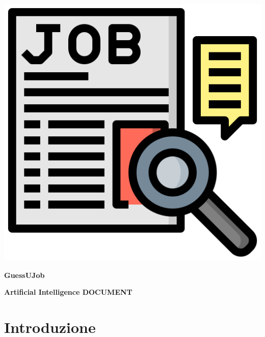 \documentclass{article}
\begin{document}
\thispagestyle{empty}

\begin{center}%
    \includegraphics[scale=0.5]{job_seeking.png}

    \vspace{1cm}

    \textbf{\huge{GuessUJob}} %

    \vspace{0.5cm}

    \textbf{\large Artificial Intelligence DOCUMENT}
\end{center}

\newpage %

\tableofcontents

\newpage

\section{Introduzione}
\lipsum[3]
\end{document}
